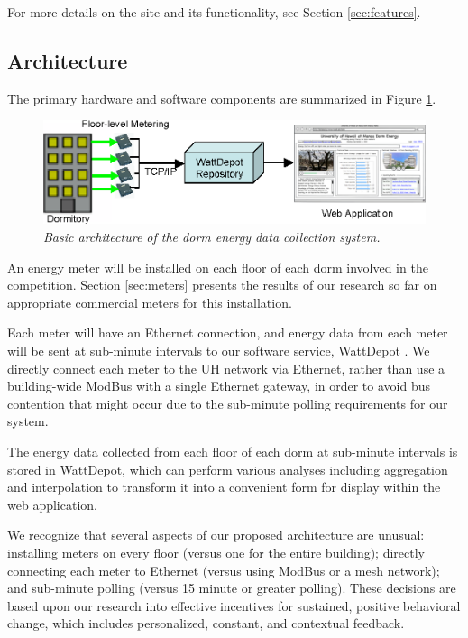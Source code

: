 \documentclass[11pt]{article}
\begin{document}
For more details on the site and its functionality, see Section \ref{sec:features}.

\subsection{Architecture}

The primary hardware and software components are summarized in Figure \ref{fig:architecture}.

\begin{figure}[!ht]
  \center
  \includegraphics[width=1.0\textwidth]{architecture.ppt.eps}
  \caption{\em \small Basic architecture of the dorm energy data collection system.}
 \label{fig:architecture}
\end{figure} 

An energy meter will be installed on each floor of each dorm involved in
the competition.  Section \ref{sec:meters} presents the results of our
research so far on appropriate commercial meters for this installation. 

Each meter will have an Ethernet connection, and energy data from each
meter will be sent at sub-minute intervals to our software service,
WattDepot \cite{WattDepot}.  We directly connect each meter to the UH network via Ethernet,
rather than use a building-wide ModBus with a single Ethernet gateway, in
order to avoid bus contention that might occur due to the sub-minute
polling requirements for our system.

The energy data collected from each floor of each dorm at sub-minute
intervals is stored in WattDepot, which can perform various analyses
including aggregation and interpolation to transform it into a
convenient form for display within the web application.

We recognize that several aspects of our proposed architecture are unusual:
installing meters on every floor (versus one for the entire building);
directly connecting each meter to Ethernet (versus using ModBus or a mesh
network); and sub-minute polling (versus 15 minute or greater polling).
These decisions are based upon our research into effective incentives for
sustained, positive behavioral change, which includes personalized,
constant, and contextual feedback.  
\end{document}
